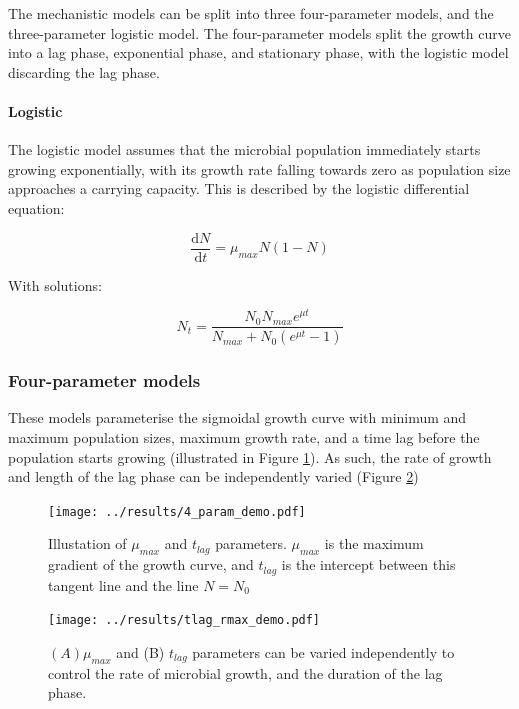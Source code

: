 \documentclass[11pt, a4paper]{article}
\begin{document}
\begin{linenumbers}
The mechanistic models can be split into three four-parameter models, and the three-parameter logistic model. The four-parameter models split the growth curve into a lag phase, exponential phase, and stationary phase, with the logistic model discarding the lag phase.

\paragraph{Logistic}
The logistic model \cite{logisticVel1, logisticVel2} assumes that the microbial population immediately starts growing exponentially, with its growth rate falling towards zero as population size approaches a carrying capacity. This is described by the logistic differential equation:

\[ \frac{\mathrm d N}{\mathrm d t} =  \mu_{max}N(1-N)  \]

With solutions:

\[ N_t =   \frac{N_0  N_{max} e^{\mu t}}{N_{max} + N_0 (e^{\mu t} - 1)} \]


\subsubsection{Four-parameter models}

These models parameterise the sigmoidal growth curve with minimum and maximum population sizes, maximum growth rate, and a time lag before the population starts growing (illustrated in Figure \ref{fig:4_param_demo}). As such, the rate of growth and length of the lag phase can be independently varied (Figure \ref{fig:parameter_variation_demo})

        \begin{figure}[H]
        \centering
        \texttt{[image: ../results/4\_param\_demo.pdf]}
        \caption{Illustation of $\mu_{max}$ and $t_{lag}$ parameters. $\mu_{max}$ is the maximum gradient of the growth curve, and $t_{lag}$ is the intercept between this tangent line and the line $N = N_0$}
        \label{fig:4_param_demo}
        \end{figure}


        \begin{figure}[H]
        \texttt{[image: ../results/tlag\_rmax\_demo.pdf]}
        \caption{ $(A)\mu_{max}$ and (B) $t_{lag}$ parameters can be varied independently to control the rate of microbial growth, and the duration of the lag phase.}
        \label{fig:parameter_variation_demo}
        \end{figure}




\end{linenumbers}
\end{document}
